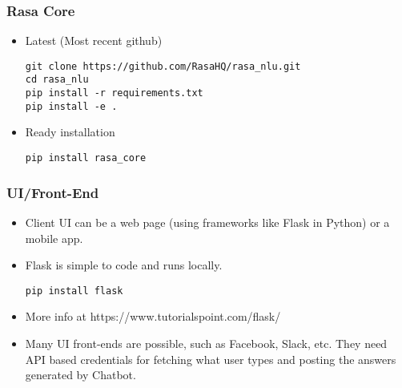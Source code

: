  \begin{frame}[fragile]\frametitle{Rasa Core}
\begin{itemize}
\item Latest (Most recent github)
\begin{lstlisting}
git clone https://github.com/RasaHQ/rasa_nlu.git
cd rasa_nlu
pip install -r requirements.txt
pip install -e .
\end{lstlisting}
\item Ready installation
\begin{lstlisting}
pip install rasa_core
\end{lstlisting}
\end{itemize}
\end{frame}



 \begin{frame}[fragile]\frametitle{UI/Front-End}
\begin{itemize}
\item Client UI can be a web page (using frameworks like Flask in Python) or a mobile app. 
\item Flask is simple to code and runs locally. 
\begin{lstlisting}
pip install flask
\end{lstlisting}
\item More info at https://www.tutorialspoint.com/flask/
\item Many UI front-ends are possible, such as Facebook, Slack, etc. They need API based credentials for fetching what user types and posting the answers generated by Chatbot.
\end{itemize}

\end{frame}

